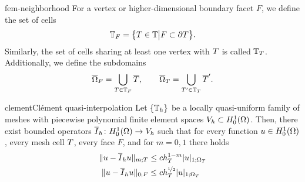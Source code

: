 \begin{Definition}{fem-neighborhood}
  For a vertex or higher-dimensional boundary facet $F$, we define the
  set of cells
  \begin{gather}
    \mathbb T_{F} = \bigl\{ T\in\mathbb T \big|F \subset\partial T \bigr\}.
  \end{gather}
  Similarly, the set of cells sharing at least one vertex with $T$
  is called $\mathbb T_{T}$. Additionally, we define the subdomains
  \begin{gather}
    \overline{\Omega}_{F} = \bigcup_{T\in \mathbb T_{F}}\overline{T},
    \qquad
    \overline{\Omega}_{T} = \bigcup_{T'\in \mathbb T_{T}}\overline{T}'.
  \end{gather}
\end{Definition}

\begin{Theorem*}{clement}{Clément quasi-interpolation}
  Let $\{\mathbb T_h\}$ be a locally quasi-uniform family of meshes with
  piecewise polynomial finite element spaces
  $V_h\subset H^1_0(\Omega)$. Then, there exist bounded operators
  $\overline I_h\colon H^1_0(\Omega) \to V_h$ such that for every
  function $u\in H^1_0(\Omega)$, every mesh cell $T$, every face
  $F$, and for $m=0,1$ there holds
  \begin{align}
    \lVert u-\overline I_h u\rVert_{m;T} &\le c h_T^{1-m} \lvert u\rvert_{1;\Omega_T} \\
    \lVert u-\overline I_h u\rVert_{0;F} &\le c h_T^{\nicefrac{1}{2}} \lvert u\rvert_{1;\Omega_T}
  \end{align}
\end{Theorem*}

